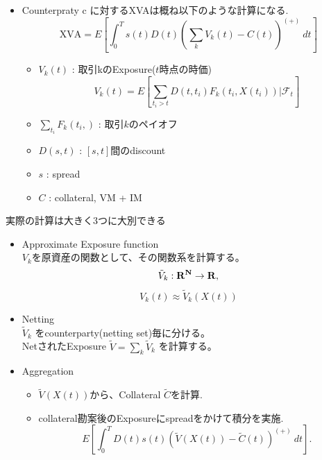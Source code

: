 \documentclass[driverfallback=dvipdfmx,cjk]{beamer}
\begin{document}
\begin{frame}
    \begin{itemize}
        \item Counterpraty c に対するXVAは概ね以下のような計算になる.
            $$ \text{XVA}=  E\left[\int_0^T s(t)D(t)\left(\sum_{k}V_k(t)- C(t)\right)^{(+)} \ dt\right] $$
            \begin{itemize}
                \item $V_k(t)$ : 取引kのExposure($t$時点の時価)
                    $$ V_k(t) = E\left[ \sum_{t_i > t} D(t, t_i) F_k(t_i, X(t_i)) | \mathcal{F}_t\right]$$
                \item $\sum_{t_i } F_k(t_i, )$ : 取引$k$のペイオフ
                \item $D(s,t)$ : $[s, t]$間のdiscount
                \item $s$ : spread 
                \item $C$ : collateral, VM + IM
            \end{itemize}
    \end{itemize}
\end{frame} 

\begin{frame}
    実際の計算は大きく3つに大別できる
    \begin{itemize}
        \item Approximate Exposure function \\
            $V_k$を原資産の関数として、その関数系を計算する。
            $$ \tilde{V}_k: \bf{R}^N \rightarrow \bf{R},$$
            $$V_k(t) \approx \tilde{V}_k(X(t))$$
        \item Netting\\
            $\tilde{V}_k$ をcounterparty(netting set)毎に分ける。\\
            NetされたExposure $\tilde{V}=\sum_{k} \tilde{V}_k$
            を計算する。
        \item Aggregation
            \begin{itemize}
                \item $\tilde{V}(X(t))$から、Collateral $\tilde{C}$を計算.
                \item collateral勘案後のExposureにspreadをかけて積分を実施.
                    $$ E\left[\int_0^T D(t)s(t) \left(\tilde{V}(X(t)) -\tilde{C}(t) \right)^{(+)} \ dt\right].$$
            \end{itemize}
    \end{itemize}
\end{frame}
\end{document}
